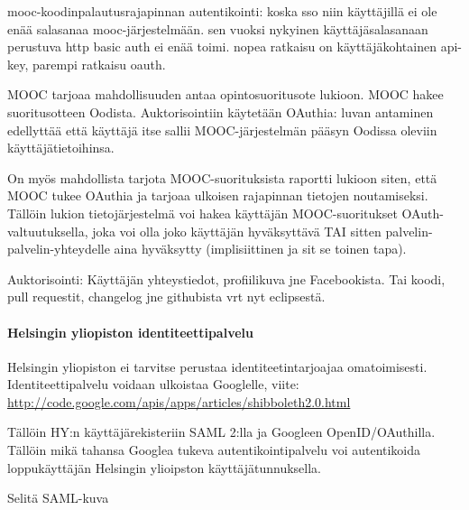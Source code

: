 \documentclass[finnish,gradu]{tktltiki}
\begin{document}
  mooc-koodinpalautusrajapinnan autentikointi: koska sso niin käyttäjillä ei ole enää salasanaa mooc-järjestelmään. sen vuoksi nykyinen käyttäjäsalasanaan perustuva http basic auth ei enää toimi. nopea ratkaisu on käyttäjäkohtainen api-key, parempi ratkaisu oauth.

  MOOC tarjoaa mahdollisuuden antaa opintosuoritusote lukioon. MOOC hakee suoritusotteen Oodista. Auktorisointiin käytetään OAuthia: luvan antaminen edellyttää että käyttäjä itse sallii MOOC-järjestelmän pääsyn Oodissa oleviin käyttäjätietoihinsa.

  On myös mahdollista tarjota MOOC-suorituksista raportti lukioon siten, että MOOC tukee OAuthia ja tarjoaa ulkoisen rajapinnan tietojen noutamiseksi. Tällöin lukion tietojärjestelmä voi hakea käyttäjän MOOC-suoritukset OAuth-valtuutuksella, joka voi olla joko käyttäjän hyväksyttävä TAI sitten palvelin-palvelin-yhteydelle aina hyväksytty (implisiittinen ja sit se toinen tapa).

  Auktorisointi: Käyttäjän yhteystiedot, profiilikuva jne Facebookista. Tai koodi, pull requestit, changelog jne githubista vrt nyt eclipsestä.



  \paragraph{Helsingin yliopiston identiteettipalvelu} %
  \label{par:helsingin_yliopiston_identiteettipalvelu}

  Helsingin yliopiston ei tarvitse perustaa identiteetintarjoajaa omatoimisesti. Identiteettipalvelu voidaan ulkoistaa Googlelle, viite: \url{http://code.google.com/apis/apps/articles/shibboleth2.0.html}

  Tällöin HY:n käyttäjärekisteriin SAML 2:lla ja Googleen OpenID/OAuthilla. Tällöin mikä tahansa Googlea tukeva autentikointipalvelu voi autentikoida loppukäyttäjän Helsingin ylioipston käyttäjätunnuksella.

  Selitä SAML-kuva %


\end{document}
